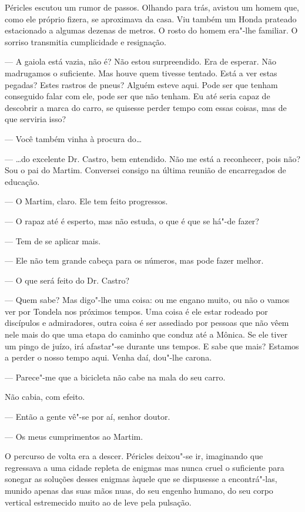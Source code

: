 Péricles escutou um rumor de passos. Olhando para trás, avistou um homem
que, como ele próprio fizera, se aproximava da casa. Viu também um
Honda prateado estacionado a algumas dezenas de metros. O rosto do homem
era"-lhe familiar. O sorriso transmitia cumplicidade e resignação.

--- A gaiola está vazia, não é? Não estou surpreendido. Era de esperar.
  Não madrugamos o suficiente. Mas houve quem tivesse tentado. Está a
  ver estas pegadas? Estes rastros de pneus? Alguém esteve aqui. Pode ser
  que tenham conseguido falar com ele, pode ser que não tenham. Eu até
  seria capaz de descobrir a marca do carro, se quisesse perder tempo
  com essas coisas, mas de que serviria isso?

--- Você também vinha à procura do\ldots{}

--- \ldots{}do excelente Dr. Castro, bem entendido. Não me
está a reconhecer, pois não? Sou o pai do Martim. Conversei consigo na
última reunião de encarregados de educação.

--- O Martim, claro. Ele tem feito progressos.

--- O rapaz até é esperto, mas não estuda, o que é que se há"-de fazer?

--- Tem de se aplicar mais.

--- Ele não tem grande cabeça para os números, mas pode fazer melhor.

--- O que será feito do Dr. Castro?

--- Quem sabe? Mas digo"-lhe uma coisa: ou me engano muito, ou não o vamos
  ver por Tondela nos próximos tempos. Uma coisa é ele estar rodeado por
  discípulos e admiradores, outra coisa é ser assediado por pessoas que
  não vêem nele mais do que uma etapa do caminho que conduz até a
  Mônica. Se ele tiver um pingo de juízo, irá afastar"-se durante uns
  tempos. E sabe que mais? Estamos a perder o nosso tempo aqui. Venha
  daí, dou"-lhe carona.

--- Parece"-me que a bicicleta não cabe na mala do seu carro.


Não cabia, com efeito.

--- Então a gente vê"-se por aí, senhor doutor.

--- Os meus cumprimentos ao Martim.


O percurso de volta era a descer. Péricles deixou"-se ir, imaginando
que regressava a uma cidade repleta de enigmas mas nunca cruel o
suficiente para sonegar as soluções desses enigmas àquele que se
dispusesse a encontrá"-las, munido apenas das suas mãos nuas, do seu
engenho humano, do seu corpo vertical estremecido muito ao de leve pela
pulsação.

